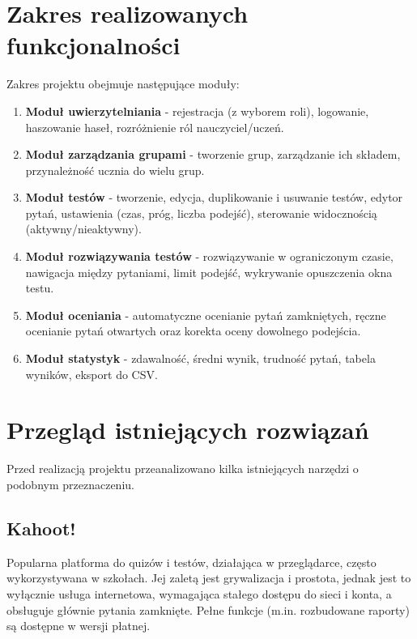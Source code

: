 \section{Zakres realizowanych funkcjonalności}
\label{sec:zakres}

Zakres projektu obejmuje następujące moduły:

\begin{enumerate}
  \item \textbf{Moduł uwierzytelniania} - rejestracja (z wyborem roli), logowanie, haszowanie haseł,
        rozróżnienie ról nauczyciel/uczeń.
  \item \textbf{Moduł zarządzania grupami} - tworzenie grup, zarządzanie ich składem, przynależność
        ucznia do wielu grup.
  \item \textbf{Moduł testów} - tworzenie, edycja, duplikowanie i usuwanie testów, edytor pytań,
        ustawienia (czas, próg, liczba podejść), sterowanie widocznością (aktywny/nieaktywny).
  \item \textbf{Moduł rozwiązywania testów} - rozwiązywanie w ograniczonym czasie, nawigacja między
        pytaniami, limit podejść, wykrywanie opuszczenia okna testu.
  \item \textbf{Moduł oceniania} - automatyczne ocenianie pytań zamkniętych, ręczne ocenianie pytań
        otwartych oraz korekta oceny dowolnego podejścia.
  \item \textbf{Moduł statystyk} - zdawalność, średni wynik, trudność pytań, tabela wyników,
        eksport do CSV.
\end{enumerate}

\section{Przegląd istniejących rozwiązań}
\label{sec:przeglad}

Przed realizacją projektu przeanalizowano kilka istniejących narzędzi o podobnym przeznaczeniu.

\subsection{Kahoot!}

Popularna platforma do quizów i testów, działająca w przeglądarce, często wykorzystywana w szkołach.
Jej zaletą jest grywalizacja i prostota, jednak jest to wyłącznie usługa internetowa, wymagająca
stałego dostępu do sieci i konta, a obsługuje głównie pytania zamknięte. Pełne funkcje (m.in.
rozbudowane raporty) są dostępne w wersji płatnej.

